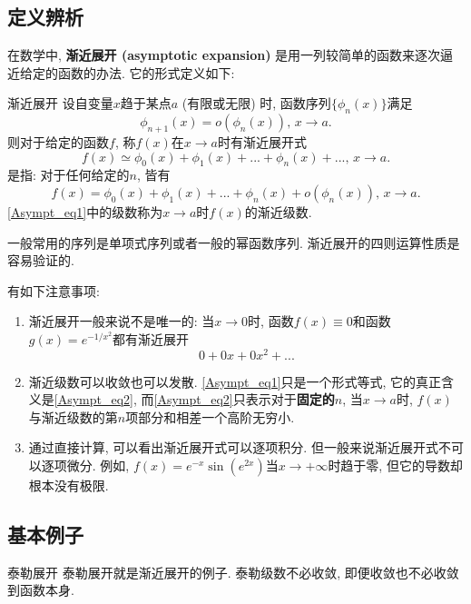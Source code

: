 
\subsection{定义辨析}
在数学中, \textbf{渐近展开 (asymptotic expansion)} 是用一列较简单的函数来逐次逼近给定的函数的办法. 它的形式定义如下:

\begin{definition}{渐近展开}
设自变量$x$趋于某点$a$ (有限或无限) 时, 函数序列$\{\phi_{n}(x)\}$满足
$$
\phi_{n+1}(x)=o(\phi_n(x)),\,x\to a.
$$
则对于给定的函数$f$, 称$f(x)$在$x\to a$时有渐近展开式
\begin{equation}\label{Asympt_eq1}
f(x)\simeq\phi_0(x)+\phi_1(x)+...+\phi_n(x)+...,\,x\to a.
\end{equation}
是指: 对于任何给定的$n$, 皆有
\begin{equation}\label{Asympt_eq2}
f(x)=\phi_0(x)+\phi_1(x)+...+\phi_n(x)+o(\phi_n(x)),\,x\to a.
\end{equation}
\autoref{Asympt_eq1}中的级数称为$x\to a$时$f(x)$的渐近级数.
\end{definition}

一般常用的序列是单项式序列或者一般的幂函数序列. 渐近展开的四则运算性质是容易验证的.

有如下注意事项:
\begin{enumerate}
\item 渐近展开一般来说不是唯一的: 当$x\to0$时, 函数$f(x)\equiv 0$和函数$g(x)=e^{-1/x^2}$都有渐近展开
$$
0+0x+0x^2+...
$$

\item 渐近级数可以收敛也可以发散. \autoref{Asympt_eq1}只是一个形式等式, 它的真正含义是\autoref{Asympt_eq2}, 而\autoref{Asympt_eq2}只表示对于\textbf{固定的$n$}, 当$x\to a$时, $f(x)$与渐近级数的第$n$项部分和相差一个高阶无穷小. 

\item 通过直接计算, 可以看出渐近展开式可以逐项积分. 但一般来说渐近展开式不可以逐项微分. 例如, $f(x)=e^{-x}\sin(e^{2x})$当$x\to+\infty$时趋于零, 但它的导数却根本没有极限.
\end{enumerate}

\subsection{基本例子}
\begin{example}{泰勒展开}
泰勒展开就是渐近展开的例子. 泰勒级数不必收敛, 即便收敛也不必收敛到函数本身.
\end{example}

